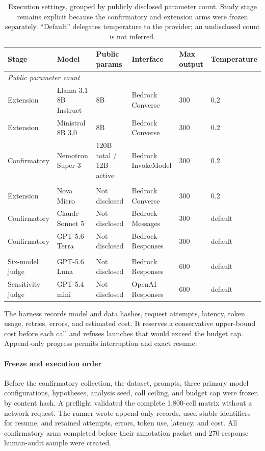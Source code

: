 \documentclass[conference]{IEEEtran}
\begin{document}
\begin{table}[t]
\centering
\scriptsize
\caption{Execution settings, grouped by publicly disclosed parameter count.
Study stage remains explicit because the confirmatory and extension arms were
frozen separately. ``Default'' delegates temperature to the provider; an
undisclosed count is not inferred.}
\label{tab:config}
\begin{tabular}{llllll}
\toprule
Stage & Model & Public params & Interface & Max output & Temperature \\
\midrule
\multicolumn{6}{l}{\textit{Public parameter count}} \\
Extension & Llama 3.1 8B Instruct & 8B & Bedrock Converse & 300 & 0.2 \\
Extension & Ministral 8B 3.0 & 8B & Bedrock Converse & 300 & 0.2 \\
Confirmatory & Nemotron Super 3 & 120B total / 12B active & Bedrock InvokeModel & 300 & 0.2 \\
\addlinespace
\multicolumn{6}{l}{\textit{Parameter count not publicly disclosed}} \\
Extension & Nova Micro & Not disclosed & Bedrock Converse & 300 & 0.2 \\
Confirmatory & Claude Sonnet 5 & Not disclosed & Bedrock Messages & 300 & default \\
Confirmatory & GPT-5.6 Terra & Not disclosed & Bedrock Responses & 300 & default \\
\addlinespace
\multicolumn{6}{l}{\textit{Automated judges}} \\
Six-model judge & GPT-5.6 Luna & Not disclosed & Bedrock Responses & 600 & default \\
Sensitivity judge & GPT-5.4 mini & Not disclosed & OpenAI Responses & 600 & default \\
\bottomrule
\end{tabular}
\end{table}

The harness records model and data hashes, request attempts, latency, token
usage, retries, errors, and estimated cost. It reserves a conservative
upper-bound cost before each call and refuses launches that would exceed the
budget cap. Append-only progress permits interruption and exact resume.

\paragraph{Freeze and execution order}

Before the confirmatory collection, the dataset, prompts, three primary model
configurations, hypotheses, analysis seed, call ceiling, and budget cap were
frozen by content hash. A preflight validated the complete 1,800-cell matrix
without a network request. The runner wrote append-only records, used stable
identifiers for resume, and retained attempts, errors, token use, latency, and
cost. All confirmatory arms completed before their annotation packet and
270-response human-audit sample were created.
\end{document}
